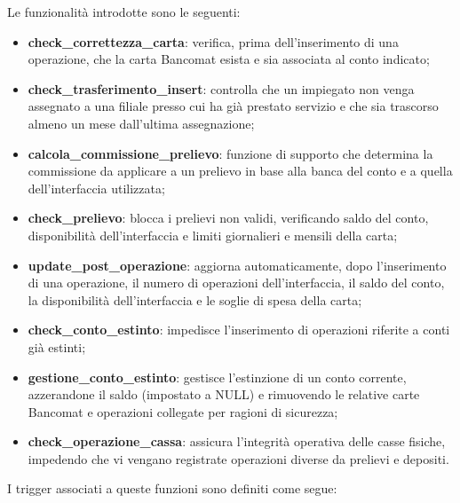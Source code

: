Le funzionalità introdotte sono le seguenti:
\begin{itemize}
  \item \textbf{check\_correttezza\_carta}: verifica, prima dell'inserimento di una operazione, che la carta Bancomat esista e sia associata al conto indicato;
  \item \textbf{check\_trasferimento\_insert}: controlla che un impiegato non venga assegnato a una filiale presso cui ha già prestato servizio e che sia trascorso almeno un mese dall'ultima assegnazione;
  \item \textbf{calcola\_commissione\_prelievo}: funzione di supporto che determina la commissione da applicare a un prelievo in base alla banca del conto e a quella dell'interfaccia utilizzata;
  \item \textbf{check\_prelievo}: blocca i prelievi non validi, verificando saldo del conto, disponibilità dell'interfaccia e limiti giornalieri e mensili della carta;
  \item \textbf{update\_post\_operazione}: aggiorna automaticamente, dopo l'inserimento di una operazione, il numero di operazioni dell'interfaccia, il saldo del conto, la disponibilità dell'interfaccia e le soglie di spesa della carta;
  \item \textbf{check\_conto\_estinto}: impedisce l'inserimento di operazioni riferite a conti già estinti;
  \item \textbf{gestione\_conto\_estinto}: gestisce l'estinzione di un conto corrente, azzerandone il saldo (impostato a NULL) e rimuovendo le relative carte Bancomat e operazioni collegate per ragioni di sicurezza;
  \item \textbf{check\_operazione\_cassa}: assicura l'integrità operativa delle casse fisiche, impedendo che vi vengano registrate operazioni diverse da prelievi e depositi.
\end{itemize}

I trigger associati a queste funzioni sono definiti come segue:

